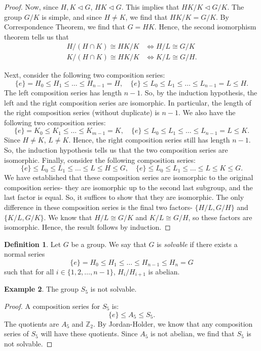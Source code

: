 \documentclass[a4paper, openany]{memoir}
\theoremstyle{definition}
\newtheorem{definition}{Definition}[section]
\newtheorem{example}[definition]{Example}
\theoremstyle{plain}
\begin{document}
\begin{proof}
        Now, since $H, K \vartriangleleft G$, $HK \vartriangleleft G$. This implies that $HK/K \vartriangleleft G/K$. The group $G/K$ is simple, and since $H \neq K$, we find that $HK/K = G/K$. By Correspondence Theorem, we find that $G = HK$. Hence, the second isomorphism theorem tells us that
        \begin{align*}
            H/(H \cap K) \cong HK/K &\iff H/L \cong G/K \\
            K/(H \cap K) \cong HK/K &\iff K/L \cong G/H.
        \end{align*}
        
        Next, consider the following two composition series:
        \[\{e\} = H_0 \leq H_1 \leq \dots \leq H_{n-1} = H, \quad \{e\} \leq L_0 \leq L_1 \leq \dots \leq L_{n-1} = L \leq H.\]
        The left composition series has length $n-1$. So, by the induction hypothesis, the left and the right composition series are isomorphic. In particular, the length of the right composition series (without duplicate) is $n-1$. We also have the following two composition series:
        \[\{e\} = K_0 \leq K_1 \leq \dots \leq K_{m-1} = K, \quad \{e\} \leq L_0 \leq L_1 \leq \dots \leq L_{n-1} = L \leq K.\]
        Since $H \neq K$, $L \neq K$. Hence, the right composition series still has length $n-1$. So, the induction hypothesis tells us that the two composition series are isomorphic. Finally, consider the following composition series:
        \[\{e\} \leq L_0 \leq L_1 \leq \dots \leq L \leq H \leq G, \quad \{e\} \leq L_0 \leq L_1 \leq \dots \leq L \leq K \leq G.\]
        We have established that these composition series are isomorphic to the original composition series- they are isomorphic up to the second last subgroup, and the last factor is equal. So, it suffices to show that they are isomorphic. The only difference in these composition series is the final two factors- $\{H/L, G/H\}$ and $\{K/L, G/K\}$. We know that $H/L \cong G/K$ and $K/L \cong G/H$, so these factors are isomorphic. Hence, the result follows by induction.
    \end{proof}

    \begin{definition}
        Let $G$ be a group. We say that $G$ is \emph{solvable} if there exists a normal series
        \[\{e\} = H_0 \leq H_1 \leq \dots \leq H_{n-1} \leq H_n = G\]
        such that for all $i \in \{1, 2, \dots, n-1\}$, $H_i/H_{i+1}$ is abelian.
    \end{definition}

    \begin{example}
        The group $S_5$ is not solvable.
    \end{example}
    \begin{proof}
        A composition series for $S_5$ is:
        \[\{e\} \leq A_5 \leq S_5.\]
        The quotients are $A_5$ and $\mathbb{Z}_2$. By Jordan-Holder, we know that any composition series of $S_5$ will have these quotients. Since $A_5$ is not abelian, we find that $S_5$ is not solvable.
    \end{proof}
\end{document}
